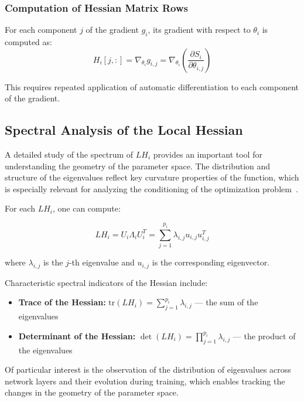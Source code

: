 \documentclass[a4paper,12pt]{article}
\begin{document}
\subsubsection{Computation of Hessian Matrix Rows}
For each component $j$ of the gradient $g_i$, its gradient with respect to $\theta_i$ is computed as:
\begin{equation}
  H_i[j,:] = \nabla_{\theta_i} g_{i,j} = \nabla_{\theta_i} \left( \frac{\partial S_i}{\partial \theta_{i,j}} \right)
\end{equation}

This requires repeated application of automatic differentiation to each component of the gradient.

\subsection{Spectral Analysis of the Local Hessian}

A detailed study of the spectrum of $LH_i$ provides an important tool for understanding the geometry of the
parameter space. The distribution and structure of the eigenvalues reflect key curvature properties of the
function, which is especially relevant for analyzing the conditioning of the optimization
problem~\cite{sagun2016, liaomahoney2021}.

For each $LH_i$, one can compute:

\begin{equation}
  LH_i = U_i\Lambda_i U_i^T = \sum_{j=1}^{p_i} \lambda_{i,j} u_{i,j} u_{i,j}^T
\end{equation}

where $\lambda_{i,j}$ is the $j$-th eigenvalue and $u_{i,j}$ is the corresponding eigenvector.

Characteristic spectral indicators of the Hessian include:

\begin{itemize}
  \item \textbf{Trace of the Hessian:} $\text{tr}(LH_i) = \sum_{j=1}^{p_i} \lambda_{i,j}$ — the sum of the eigenvalues
  \item \textbf{Determinant of the Hessian:} $\det(LH_i) = \prod_{j=1}^{p_i} \lambda_{i,j}$ — the product of
    the eigenvalues
\end{itemize}

Of particular interest is the observation of the distribution of eigenvalues across network layers and their
evolution during training, which enables tracking the changes in the geometry of the parameter space.
\end{document}
